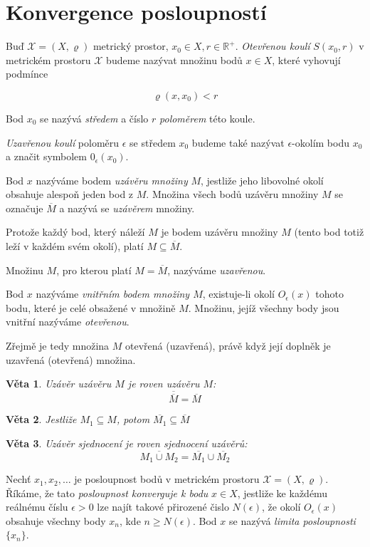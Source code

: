 \documentclass[a4paper, 11pt]{report}
\newtheorem{veta}{Věta}[chapter]
\begin{document}
\section{Konvergence posloupností}
Buď $\mathcal{X} = (X, \varrho)$ metrický prostor, $x_0 \in X, r \in \mathbb{R}^+$. \emph{Otevřenou koulí} $S(x_0, r)$ v metrickém prostoru $\mathcal{X}$ budeme nazývat množinu bodů $x \in X$, které vyhovují podmínce

$$\varrho(x, x_0) < r$$

Bod $x_0$ se nazývá \emph{středem} a číslo $r$ \emph{poloměrem} této koule.

\emph{Uzavřenou koulí} poloměru $\epsilon$ se středem $x_0$ budeme také nazývat $\epsilon$-okolím bodu $x_0$ a značit symbolem $0_\epsilon(x_0)$.

Bod $x$ nazýváme bodem \emph{uzávěru množiny} $M$, jestliže jeho libovolné okolí obsahuje alespoň jeden bod z $M$. Množina všech bodů uzávěru množiny $M$ se označuje $\overline{M}$ a nazývá se \emph{uzávěrem} množiny.

Protože každý bod, který náleží $M$ je bodem uzávěru množiny $M$ (tento bod totiž leží v každém svém okolí), platí $M \subseteq \overline{M}$.

Množinu $M$, pro kterou platí $M = \overline{M}$, nazýváme \emph{uzavřenou}.

Bod $x$ nazýváme \emph{vnitřním bodem množiny $M$}, existuje-li okolí $O_\epsilon(x)$ tohoto bodu, které je celé obsažené v množině $M$. Množinu, jejíž všechny body jsou vnitřní nazýváme \emph{otevřenou}.

Zřejmě je tedy množina $M$ otevřená (uzavřená), právě když její doplněk je uzavřená (otevřená) množina.

\begin{veta}
Uzávěr uzávěru $M$ je roven uzávěru $M$:
$$ \overline{\overline{M}} = \overline{M} $$
\end{veta}

\begin{veta}
Jestliže $M_1 \subseteq M$, potom $\overline{M_1} \subseteq \overline{M}$
\end{veta}

\begin{veta}
Uzávěr sjednocení je roven sjednocení uzávěrů:
$$ \overline{M_1 \cup M_2} = \overline{M_1} \cup \overline{M_2} $$
\end{veta}

Nechť $x_1, x_2, \dots$ je posloupnost bodů v metrickém prostoru $\mathcal{X} = (X, \varrho)$. Říkáme, že tato \emph{posloupnost konverguje k bodu} $x \in X$, jestliže ke každému reálnému číslu $\epsilon > 0$ lze najít takové přirozené čislo $N(\epsilon)$, že okolí $O_\epsilon(x)$ obsahuje všechny body $x_n$, kde $n \geq N(\epsilon)$. Bod $x$ se nazývá \emph{limita posloupnosti} $\{x_n\}$.
\end{document}

